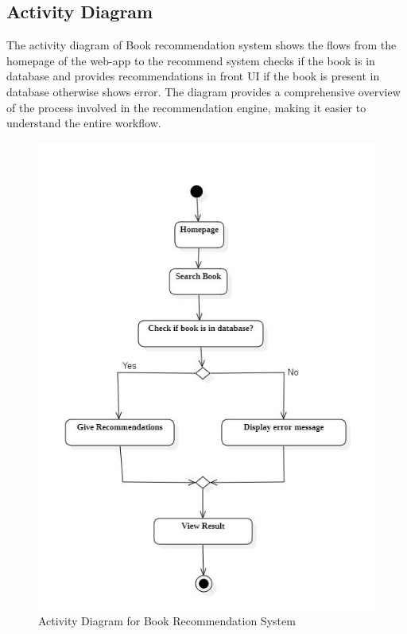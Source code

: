 \newpage
\subsection{Activity Diagram}
The activity diagram of Book recommendation system shows the flows
from the homepage of the web-app to the recommend system checks if the book is in database and provides recommendations in front UI if the book is present in database otherwise shows error. The diagram provides a comprehensive overview of the process involved in the recommendation engine, making it easier to understand the
entire workflow.
\begin{figure}[h]
    \centering
    \includegraphics[width=0.9\linewidth]{img/Graphics/BRS_Activity.jpg}
    \caption{Activity Diagram for Book Recommendation System}
    \label{Activity}
\end{figure}
\newpage

